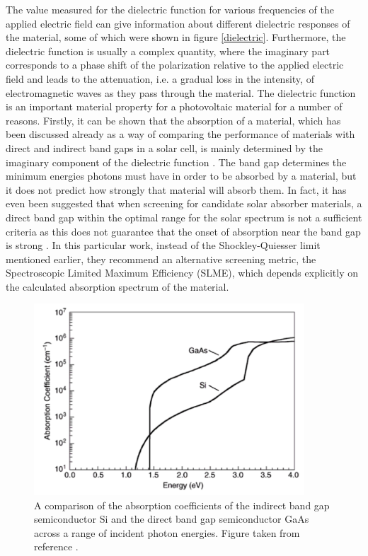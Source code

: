 The value measured for the dielectric function for various frequencies of the applied electric field can give information about different dielectric responses of the material, some of which were shown in figure \ref{dielectric}. Furthermore, the dielectric function is usually a complex quantity, where the imaginary part corresponds to a phase shift of the polarization relative to the applied electric field and leads to the attenuation, i.e. a gradual loss in the intensity, of electromagnetic waves as they pass through the material. The dielectric function is an important material property for a photovoltaic material for a number of reasons. Firstly, it can be shown that the absorption of a material, which has been discussed already as a way of comparing the performance of materials with direct and indirect band gaps in a solar cell, is mainly determined by the imaginary component of the dielectric function \cite{dielectric_func_book1}. The band gap determines the minimum energies photons must have in order to be absorbed by a material, but it does not predict how strongly that material will absorb them. 
In fact, it has even been suggested that when screening for candidate solar absorber materials, a direct band gap within the optimal range for the solar spectrum is not a sufficient criteria as this does not guarantee that the onset of absorption near the band gap is strong \cite{SLME}. In this particular work, instead of the Shockley-Quiesser limit mentioned earlier, they recommend an alternative screening metric, the Spectroscopic Limited Maximum Efficiency (SLME), which depends explicitly on the calculated absorption spectrum of the material.

\begin{figure}[h!]
  \centering
    \includegraphics[width=0.9\textwidth]{figures/absorption_fig2.png}
    \caption{A comparison of the absorption coefficients of the indirect band gap semiconductor Si and the direct band gap semiconductor GaAs across a range of incident photon energies. Figure taken from reference .}
  \label{absorption_fig2}
\end{figure}

